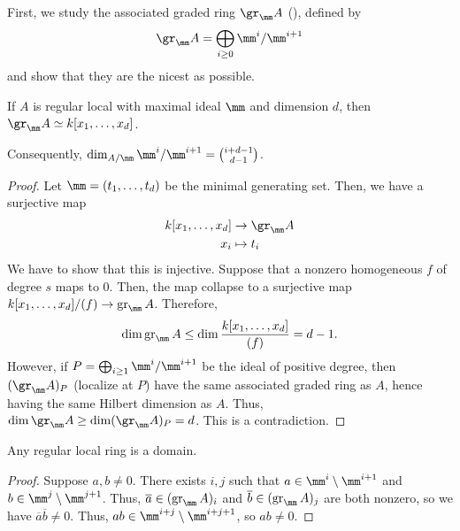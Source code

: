 First, we study the associated graded ring
$\gr_\mm A$ (), defined by
$$\gr_\mm A = \bigoplus_{i\geq 0} \mm^i/\mm^{i+1}$$
and show that they are the nicest as possible.
\begin{proposition}
    \label{prop:gr_regular_local}
    If $A$ is regular local with maximal ideal $\mm$
    and dimension $d$, then
    $\gr_\mm A \simeq k[x_1,\dots,x_d]$.

    \noindent Consequently, $\dim_{A/\mm} \mm^i/\mm^{i+1}
    = \binom{i+d-1}{d-1}$.
\end{proposition}
\begin{proof}
    Let $\mm = (t_1,\dots,t_d)$ be the minimal generating set.
    Then, we have a surjective map
    \begin{align*}
        k[x_1,\dots,x_d] &\to \gr_\mm A \\
        x_i &\mapsto t_i
    \end{align*}
    We have to show that this is injective.
    Suppose that a nonzero homogeneous $f$ of degree $s$
    maps to $0$.
    Then, the map collapse to a surjective map $k[x_1,\dots,x_d]/(f)
    \to \operatorname{gr}_\mm A$. Therefore,
    $$\dim \operatorname{gr}_\mm A
    \leq \dim \frac{k[x_1,\dots,x_d]}{(f)}
    = d-1.$$
    However, if $P = \bigoplus_{i\geq 1} \mm^i/\mm^{i+1}$
    be the ideal of positive degree,
    then $(\gr_\mm A)_P$ (localize at $P$)
    have the same associated graded ring as $A$,
    hence having the same Hilbert dimension as $A$.
    Thus, $\dim\gr_\mm A \geq \dim (\gr_\mm A)_P 
    = d$. This is a contradiction.
\end{proof}
\begin{corollary}
    Any regular local ring is a domain.
\end{corollary}
\begin{proof}
    Suppose $a,b\neq 0$.
    There exists $i,j$ such that
    $a\in\mm^i\setminus\mm^{i+1}$
    and $b\in\mm^j\setminus\mm^{j+1}$.
    Thus, $\overline a \in (\operatorname{gr}_\mm A)_i$
    and $\overline b\in (\operatorname{gr}_\mm A)_j$
    are both nonzero,
    so we have $\overline a\overline b \neq 0$.
    Thus, $ab\in\mm^{i+j}\setminus\mm^{i+j+1}$,
    so $ab\neq 0$.
\end{proof}
